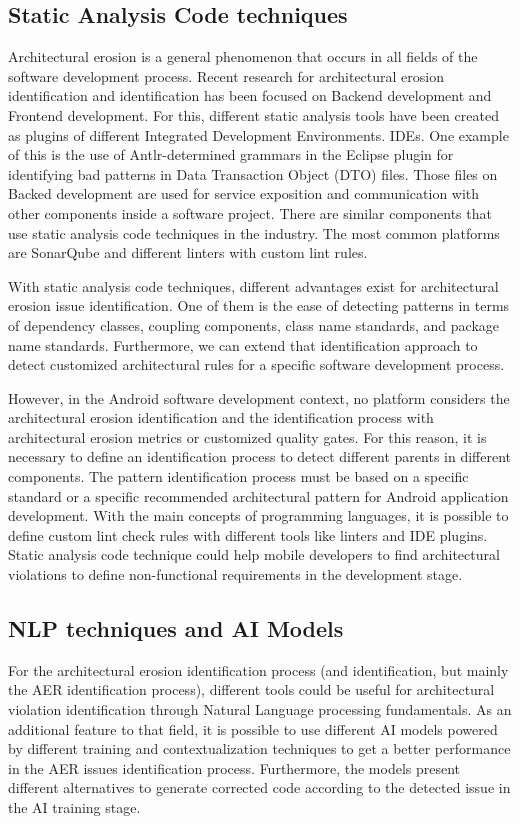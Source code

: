 \subsection{Static Analysis Code techniques}
Architectural erosion is a general phenomenon that occurs in all fields of the software development process. Recent research for architectural erosion identification and identification has been focused on Backend development and Frontend development. For this, different static analysis tools have been created as plugins of different Integrated Development Environments. IDEs. One example of this is the use of Antlr-determined grammars in the Eclipse plugin for identifying bad patterns in Data Transaction Object (DTO) files. Those files on Backed development are used for service exposition and communication with other components inside a software project.
There are similar components that use static analysis code techniques in the industry. The most common platforms are SonarQube and different linters with custom lint rules.

With static analysis code techniques, different advantages exist for architectural erosion issue identification. One of them is the ease of detecting patterns in terms of dependency classes, coupling components, class name standards, and package name standards. Furthermore, we can extend that identification approach to detect customized architectural rules for a specific software development process. \cite{master-thesis-aer-backend}

However, in the Android software development context, no platform considers the architectural erosion identification and the identification process with architectural erosion metrics or customized quality gates. For this reason, it is necessary to define an identification process to detect different parents in different components. The pattern identification process must be based on a specific standard or a specific recommended architectural pattern for Android application development. With the main concepts of programming languages, it is possible to define custom lint check rules with different tools like linters and IDE plugins. Static analysis code technique could help mobile developers to find architectural violations to define non-functional requirements in the development stage.


\subsection{NLP techniques and AI Models}
For the architectural erosion identification process (and identification, but mainly the AER identification process), different tools could be useful for architectural violation identification through Natural Language processing fundamentals. As an additional feature to that field, it is possible to use different AI models powered by different training and contextualization techniques to get a better performance in the AER issues identification process. Furthermore, the models present different alternatives to generate corrected code according to the detected issue in the AI training stage.

